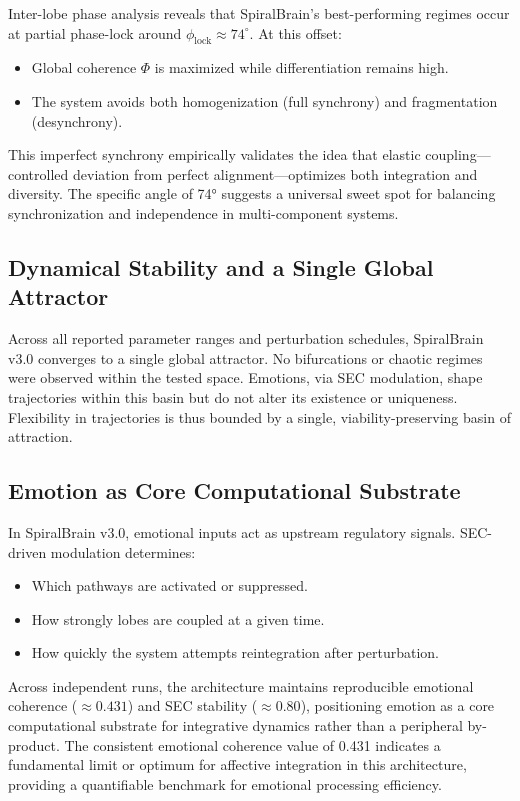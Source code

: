 \documentclass[11pt,a4paper]{article}
\begin{document}
Inter-lobe phase analysis reveals that SpiralBrain's best-performing regimes occur at partial phase-lock around \( \phi_{\text{lock}} \approx 74^\circ \). At this offset:
\begin{itemize}[leftmargin=2em]
    \item Global coherence \( \Phi \) is maximized while differentiation remains high.
    \item The system avoids both homogenization (full synchrony) and fragmentation (desynchrony).
\end{itemize}
This imper\-fect synchrony empirically validates the idea that elastic coupling---controlled deviation from perfect alignment---optimizes both integration and diversity. The specific angle of 74° suggests a universal sweet spot for balancing synchronization and independence in multi-component systems.

\subsection{Dynamical Stability and a Single Global Attractor}

Across all reported parameter ranges and perturbation schedules, SpiralBrain v3.0 converges to a single global attractor. No bifurcations or chaotic regimes were observed within the tested space. Emotions, via SEC modulation, shape trajectories within this basin but do not alter its existence or uniqueness. Flexibility in trajectories is thus bounded by a single, viability-preserving basin of attraction.

\subsection{Emotion as Core Computational Substrate}

In SpiralBrain v3.0, emotional inputs act as upstream regulatory signals. SEC-driven modulation determines:
\begin{itemize}[leftmargin=2em]
    \item Which pathways are activated or suppressed.
    \item How strongly lobes are coupled at a given time.
    \item How quickly the system attempts reintegration after perturbation.
\end{itemize}
Across independent runs, the architecture maintains reproducible emotional coherence (\(\approx 0.431\)) and SEC stability (\(\approx 0.80\)), positioning emotion as a core computational substrate for integrative dynamics rather than a peripheral by-product. The consistent emotional coherence value of 0.431 indicates a fundamental limit or optimum for affective integration in this architecture, providing a quantifiable benchmark for emotional processing efficiency.
\end{document}

